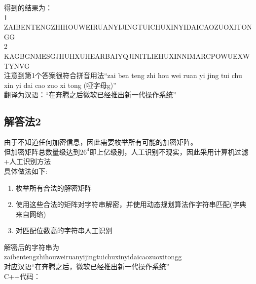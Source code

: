 \documentclass[12pt]{article}
\begin{document}
    得到的结果为：\\
    1\\
    ZAIBENTENGZHIHOUWEIRUANYIJINGTUICHUXINYIDAICAOZUOXITONGG\\
    2\\
    KAGBGNMESGJHUHXUHEARBAIYQJINITLIEHUXINNIMARCPOWUEXWTYNVG\\
    注意到第1个答案很符合拼音用法“zai ben teng zhi hou wei ruan yi jing tui chu xin yi dai cao zuo xi tong (哑字母g)”\\
    翻译为汉语：“在奔腾之后微软已经推出新一代操作系统”\\
\subsection*{解答法2}
由于不知道任何加密信息，因此需要枚举所有可能的加密矩阵。\\
但加密矩阵总数量级达到$26^4$即上亿级别，人工识别不现实，因此采用计算机过滤+人工识别方法\\
具体做法如下:
\begin{enumerate}
\item 枚举所有合法的解密矩阵
\item 使用这些合法的矩阵对字符串解密，并使用动态规划算法作字符串匹配(字典来自网络)
\item 对匹配位数高的字符串人工识别
\end{enumerate}
解密后的字符串为\\
zaibentengzhihouweiruanyijingtuichuxinyidaicaozuoxitongg\\
对应汉语``在奔腾之后，微软已经推出新一代操作系统''\\
C++代码：
\end{document}
